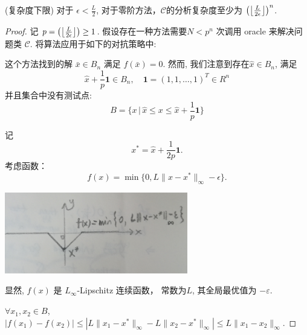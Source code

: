 \documentclass[handout]{beamer}
\begin{document}
\begin{frame}[allowframebreaks]
\framebreak

\begin{theorem}\label{TH_lower_bound_uniform_grid}(复杂度下限)
  对于 $\epsilon<\frac{L}{2}$,  对于零阶方法，$\mathcal{C}$的分析复杂度至少为 
   $\left( \big{\lfloor}\frac{L}{2\epsilon} \big{\rfloor} \right)_{}^n$.
\end{theorem}




\begin{proof}

记 $p = \left( \big{\lfloor}\frac{L}{2\epsilon} \big{\rfloor} \right) \geq 1$.
假设存在一种方法需要$N<p^n$ 次调用 oracle 来解决问题类 $\mathcal{C}$.
将算法应用于如下的对抗策略中:

这个方法找到的解 $\bar{x} \in B_n$ 满足 $f(\bar{x}) = 0$.
然而, 我们注意到存在$\hat{x} \in B_n$, 满足
\begin{equation*}
    \hat{x} + \frac{1}{p} \mathbf{1} \in B_n, \quad \mathbf{1} = (1,1,\ldots,1)_{}^T \in R^n
\end{equation*}
并且集合中没有测试点:
\begin{equation*}
    B = \{x\,|\,  \hat{x} \leq x \leq \hat{x}+ \frac{1}{p} \mathbf{1} \}
\end{equation*}

记
\begin{equation*}
    x^* = \hat{x} + \frac{1}{2p} \mathbf{1}.
\end{equation*}
考虑函数：
\begin{equation*}
    f(x) = \min\{0,L\|x-x^* \|_{\infty}^{} - \epsilon \}.
\end{equation*}

  \begin{center}
  \includegraphics[width=0.6\textwidth]{figure/fig_1_theorem_1_1_2.png}
  \end{center}
显然, $f(x)$ 是 $L_\infty$-Lipschitz 连续函数， 常数为$L$, 其全局最优值为 $-\varepsilon$.

   $ \forall x_1,x_2 \in B$, $|f(x_1)-f(x_2)| \leq | L\|x_1-x^*\|_{\infty}^{} - L\|x_2-x^*\|_{\infty}^{}  | \leq L\|x_1-x_2\|_{\infty}^{}$.


\end{proof}
\end{frame}
\end{document}
